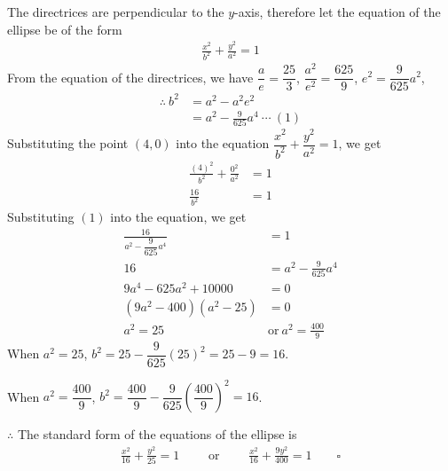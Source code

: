 \documentclass{report}
\newcommand{\eos}{ \qquad \square}
\begin{document}
\begin{enumerate}[leftmargin=*]
\begin{enumerate}
                    The directrices are perpendicular to the $y$-axis, therefore let the equation
                    of the ellipse be of the form
                    \begin{align*}
                        \frac{x^2}{b^2} + \frac{y^2}{a^2} = 1
                    \end{align*}
                    From the equation of the directrices, we have
                    $\dfrac{a}{e} = \dfrac{25}{3}$, $\dfrac{a^2}{e^2} = \dfrac{625}{9}$, $e^2 = \dfrac{9}{625}a^2$,
                    \begin{align*}
                        \therefore\ b^2 & = a^2 - a^2e^2                        \\
                                        & = a^2 - \frac{9}{625}a^4\ \cdots\ (1)
                    \end{align*}
                    Substituting the point $(4, 0)$ into the equation $\dfrac{x^2}{b^2} + \dfrac{y^2}{a^2} = 1$, we get
                    \begin{align*}
                        \frac{(4)^2}{b^2} + \frac{0^2}{a^2} & = 1 \\
                        \frac{16}{b^2}                      & = 1
                    \end{align*}
                    Substituting $(1)$ into the equation, we get
                    \begin{align*}
                        \frac{16}{a^2 - \dfrac{9}{625}a^4} & = 1                            \\
                        16                                 & = a^2 - \frac{9}{625}a^4       \\
                        9a^4 - 625a^2 + 10000              & = 0                            \\
                        (9a^2 - 400)(a^2 - 25)             & = 0                            \\
                        a^2 = 25\                          & \text{or}\ a^2 = \frac{400}{9}
                    \end{align*}
                    When $a^2 = 25$, $b^2 = 25 - \dfrac{9}{625}(25)^2 = 25 - 9 = 16$.

                    When $a^2 = \dfrac{400}{9}$, $b^2 = \dfrac{400}{9} -
                        \dfrac{9}{625}\left(\dfrac{400}{9}\right)^2 = 16$.

                    $\therefore$ The standard form of the equations of the ellipse is
                    \begin{align*}
                        \frac{x^2}{16} + \frac{y^2}{25} = 1\qquad \text{ or } \qquad \frac{x^2}{16} + \frac{9y^2}{400} = 1 \eos
                    \end{align*}
          \end{enumerate}
\end{enumerate}
\end{document}

